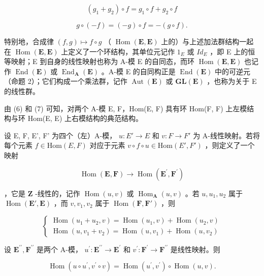 \[
\left(g _ {1} + g _ {2}\right) \circ f = g _ {1} \circ f + g _ {2} \circ f\tag{8}
\]

\[
g \circ (- f) = (- g) \circ f = - (g \circ f).
\]

特别地，合成律 \((f,g)\mapsto f\circ g\) （ \(\operatorname{Hom}(\mathbf{E},\mathbf{E})\) 上的）与上述加法群结构一起在 \(\operatorname{Hom}(\mathbf{E},\mathbf{E})\) 上定义了一个环结构，其单位元记作 \(1_{E}\) 或 \(Id_{E}\) ，即 E 上的恒等映射；E 到自身的线性映射也称为 A-模 E 的自同态，而环 \(\operatorname{Hom}(\mathbf{E},\mathbf{E})\) 也记作 \(\operatorname{End}(\mathbf{E})\) 或 \(\operatorname{End}_{\mathbf{A}}(\mathbf{E})\) 。A-模 E 的自同构正是 \(\operatorname{End}(\mathbf{E})\) 中的可逆元（命题 2）；它们构成一个乘法群，记作 \(\operatorname{Aut}(\mathbf{E})\) 或 \(\mathbf{GL}(\mathbf{E})\) ，也称为关于 E 的线性群。

由 (6) 和 (7) 可知，对两个 A-模 E, F，Hom(E, F) 具有环 Hom(F, F) 上左模结构与环 Hom(E, E) 上右模结构的典范结构。

设 E, F, E', F' 为四个（左）A-模， \(u: E' \to E\) 和 \(v: F \to F'\) 为 A-线性映射。若将每个元素 \(f \in \text{Hom}(E, F)\) 对应于元素 \(v \circ f \circ u \in \text{Hom}(E', F')\) ，则定义了一个映射

\[
\operatorname{Hom} (\mathbf {E}, \mathbf {F}) \rightarrow \operatorname{Hom} (\mathbf {E} ^ {\prime}, \mathbf {F} ^ {\prime})
\]

，它是 \(\mathbf{Z}\) -线性的，记作 \(\operatorname{Hom}(u,v)\) 或 \(\operatorname{Hom}_{\mathbf{A}}(u,v)\) 。若 \(u, u_1, u_2\) 属于 \(\operatorname{Hom}(\mathbf{E}', \mathbf{E})\) ，而 \(v, v_1, v_2\) 属于 \(\operatorname{Hom}(\mathbf{F}, \mathbf{F}')\) ，则

\[
\left\{ \begin{array}{l} \operatorname{Hom} (u _ {1} + u _ {2}, v) = \operatorname{Hom} (u _ {1}, v) + \operatorname{Hom} (u _ {2}, v) \\ \operatorname{Hom} (u, v _ {1} + v _ {2}) = \operatorname{Hom} (u, v _ {1}) + \operatorname{Hom} (u, v _ {2}) \end{array} \right.\tag{9}
\]

设 \(\mathbf{E}^{\prime \prime},\mathbf{F}^{\prime \prime}\) 是两个 A-模， \(u^{\prime}:\mathbf{E}^{\prime \prime}\to \mathbf{E}^{\prime}\) 和 \(v^{\prime}:\mathbf{F}^{\prime}\rightarrow \mathbf{F}^{\prime \prime}\) 是线性映射。则

\[
\operatorname{Hom} \left(u \circ u ^ {\prime}, v ^ {\prime} \circ v\right) = \operatorname{Hom} \left(u ^ {\prime}, v ^ {\prime}\right) \circ \operatorname{Hom} (u, v).\tag{10}
\]

